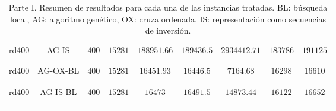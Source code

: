 \begin{table}[H]
{\begin{tabular}{c|cccccccc}
		rd400 &AG-IS & $400$ & $15281$ & $188951.66$ & $189436.5$ & $2934412.71$ & $183786$ & $191125$\\\\\\
		rd400 &AG-OX-BL& $400$ & $15281$ & $16451.93$ & $16446.5$ & $7164.68$ & $16298$ & $16610$\\\\\\
		rd400 &AG-IS-BL& $400$ & $15281$ & $16473$ & $16491.5$ & $14873.44$ & $16122$ & $16652$\\\\\\
		\midrule 


		\bottomrule
	\end{tabular}
}
	\caption{Parte I. Resumen de resultados para cada una de las instancias tratadas. BL: búsqueda local, AG: algoritmo genético, OX: cruza ordenada, IS: representación como secuencias de inversión.}
	\label{results}

\end{table}


